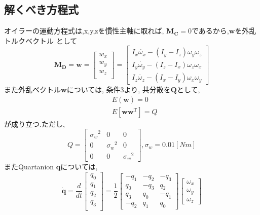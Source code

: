 \documentclass[dvipdfmx, fleqn, uplatex, a4paper]{jsarticle}
\begin{document}
\subsection{解くべき方程式}
オイラーの運動方程式は,x,y,zを慣性主軸に取れば, $\bm{M_C}=0$であるから,$\bm{w}$を外乱トルクベクトル
として
\begin{equation}
  \bm{M_D} = \bm{w}
  =
  \begin{bmatrix}
    w_x \\
    w_y \\
    w_z \\
  \end{bmatrix}
  =
  \begin{bmatrix}
    I_x\dot{\omega_x} - (I_y - I_z)\omega_y \omega_z \\
    I_y\dot{\omega_y} - (I_z - I_x)\omega_z \omega_x \\
    I_z\dot{\omega_z} - (I_x - I_y)\omega_x \omega_y
  \end{bmatrix}
\end{equation}
また外乱ベクトル$\bm{w}$については, 条件3より, 共分散を$\bm{Q}$として,
\begin{align}
   & E(\bm{w}) = 0 \\
   & E[\bm{w}{\bm{w}}^{\mathrm{T}}] = Q
\end{align}
が成り立つ.ただし,
\begin{equation}
   Q =
  \begin{bmatrix}
    {\sigma_w}^2 & 0 & 0 \\
    0 & {\sigma_w}^2 & 0 \\
    0 & 0 & {\sigma_w}^2
  \end{bmatrix}
  ,  {\sigma_w} = 0.01[Nm]
\end{equation}
またQuartanion $\bm{q}$については,
\begin{equation}
  \dot{\bm{q}} = \frac{d}{dt}
  \begin{bmatrix}
    q_0 \\
    q_1 \\
    q_2 \\
    q_3 \\
  \end{bmatrix}
  = \frac{1}{2}
  \begin{bmatrix}
    -q_1 & -q_2 & -q_3 \\
    q_0 & -q_3 & q_2 \\
    q_3 & q_0 & -q_1 \\
    -q_2 & q_1 & q_0
  \end{bmatrix}
  \begin{bmatrix}
    \omega_x \\
    \omega_y \\
    \omega_z
  \end{bmatrix}
\end{equation}
\end{document}
